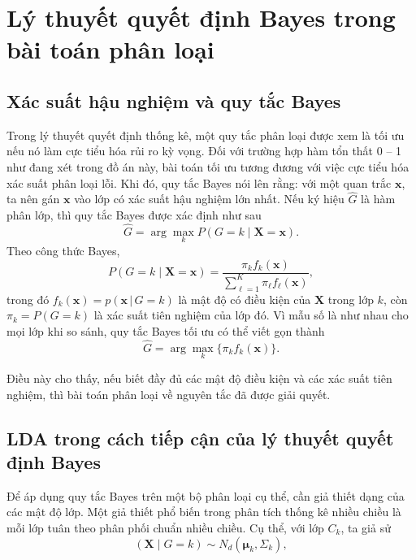 \section{Lý thuyết quyết định Bayes trong bài toán phân
loại}

\subsection{Xác suất hậu nghiệm và quy tắc Bayes}

Trong lý thuyết quyết định thống kê, một quy tắc phân loại được xem là tối ưu nếu nó làm cực tiểu hóa rủi ro kỳ vọng. Đối với trường hợp hàm tổn thất 0 -- 1 như đang xét trong đồ án này, bài toán tối ưu tương đương với việc cực tiểu hóa xác suất phân loại lỗi. Khi đó, quy tắc Bayes nói lên rằng: với một quan trắc $\bm{x}$, ta nên gán $\bm{x}$ vào lớp có xác suất hậu nghiệm lớn nhất. Nếu ký hiệu $\widehat{G}$ là hàm phân lớp, thì quy tắc Bayes được xác định như sau
\begin{equation}
\widehat{G}=\arg\max_k P(G=k\mid \bm{X}=\bm{x}).
\end{equation}
Theo công thức Bayes,
\begin{equation}
P(G=k\mid \bm{X}=\bm{x})=\frac{\pi_k f_k(\bm{x})}{\sum_{\ell=1}^{K}\pi_\ell f_\ell(\bm{x})},
\end{equation}
trong đó 
$f_k(\bm{x})=p(\bm{x}\,|\,G=k)$ là mật độ có điều kiện của $\bm{X}$ trong lớp $k$, còn $\pi_k=P(G=k)$ là xác suất tiên nghiệm của lớp đó. Vì mẫu số là như nhau cho mọi lớp khi so sánh, quy tắc Bayes tối ưu có thể viết gọn thành
\begin{equation}
\widehat{G}=\arg\max_k \{\pi_kf_k(\bm{x})\}.
\end{equation}

Điều này cho thấy, nếu biết đầy đủ các mật độ điều kiện và các xác suất tiên nghiệm, thì bài toán phân loại về nguyên tắc đã được giải quyết.

\subsection{LDA trong cách tiếp cận của lý thuyết quyết định Bayes}

Để áp dụng quy tắc Bayes trên một bộ phân loại cụ thể, cần giả thiết dạng của các mật độ lớp. Một giả thiết phổ biến trong phân tích thống kê nhiều chiều là mỗi lớp tuân theo phân phối chuẩn nhiều chiều. Cụ thể, với lớp $C_k$, ta giả sử
\begin{equation}
\left(\bm{X}\mid G=k\right)\sim N_d(\bm{\mu}_k,\Sigma_k),
\end{equation}

